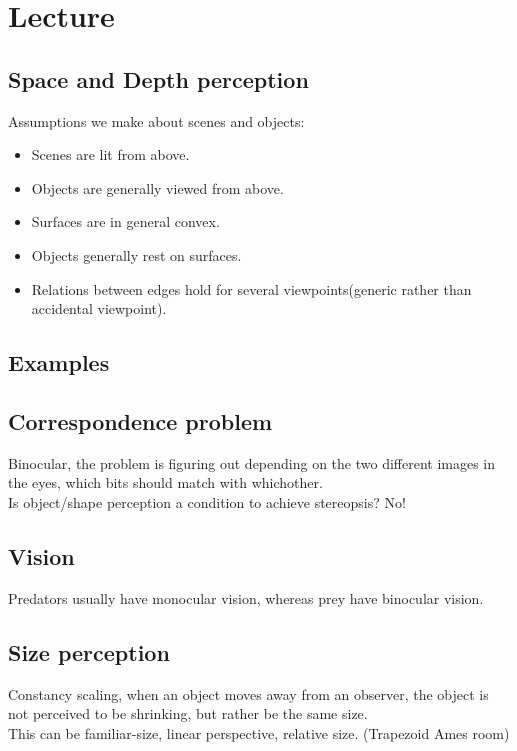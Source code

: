 \documentclass{article}
\begin{document}
\section{Lecture}
\subsection{Space and Depth perception}
Assumptions we make about scenes and objects:\\
\begin{itemize}
  \item Scenes are lit from above.
  \item Objects are generally viewed from above.
  \item Surfaces are in general convex.
  \item Objects generally rest on surfaces.
  \item Relations between edges hold for several viewpoints(generic rather than accidental viewpoint).
\end{itemize}
\subsection{Examples}
\subsection{Correspondence problem}
Binocular, the problem is figuring out depending on the two different images in the eyes, which bits should match with whichother.\\
Is object/shape perception a condition to achieve stereopsis? No!\\
\subsection{Vision}
Predators usually have monocular vision, whereas prey have binocular vision.
\subsection{Size perception}
Constancy scaling, when an object moves away from an observer, the object is not perceived to be shrinking, but rather be the same size.\\This can be familiar-size, linear perspective, relative size. (Trapezoid Ames room)\\
\end{document}
